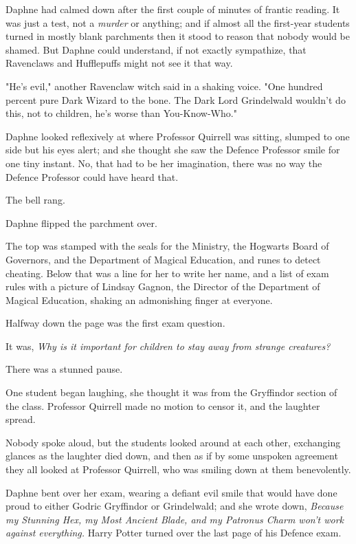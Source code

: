 Daphne had calmed down after the first couple of minutes of frantic reading. It
was just a test, not a \emph{murder} or anything; and if almost all the
first-year students turned in mostly blank parchments then it stood to reason
that nobody would be shamed. But Daphne could understand, if not exactly
sympathize, that Ravenclaws and Hufflepuffs might not see it that way.

"He’s evil," another Ravenclaw witch said in a shaking voice. "One hundred
percent pure Dark Wizard to the bone. The Dark Lord Grindelwald wouldn’t do
this, not to children, he’s worse than You-Know-Who."

Daphne looked reflexively at where Professor Quirrell was sitting, slumped to
one side but his eyes alert; and she thought she saw the Defence Professor
smile for one tiny instant. No, that had to be her imagination, there was no
way the Defence Professor could have heard that.

The bell rang.

Daphne flipped the parchment over.

The top was stamped with the seals for the Ministry, the Hogwarts Board of
Governors, and the Department of Magical Education, and runes to detect
cheating. Below that was a line for her to write her name, and a list of exam
rules with a picture of Lindsay Gagnon, the Director of the Department of
Magical Education, shaking an admonishing finger at everyone.

Halfway down the page was the first exam question.

It was, \emph{Why is it important for children to stay away from strange
creatures?}

There was a stunned pause.

One student began laughing, she thought it was from the Gryffindor section of
the class. Professor Quirrell made no motion to censor it, and the laughter
spread.

Nobody spoke aloud, but the students looked around at each other, exchanging
glances as the laughter died down, and then as if by some unspoken agreement
they all looked at Professor Quirrell, who was smiling down at them
benevolently.

Daphne bent over her exam, wearing a defiant evil smile that would have done
proud to either Godric Gryffindor or Grindelwald; and she wrote down,
\emph{Because my Stunning Hex, my Most Ancient Blade, and my Patronus Charm
won’t work against everything.}
\later
Harry Potter turned over the last page of his Defence exam.

